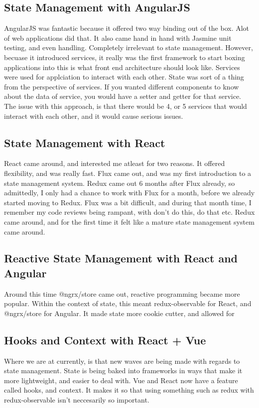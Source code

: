 \subsection{ State Management with AngularJS }
AngularJS was fantastic because it offered two way binding out of the box. Alot
of web applications did that. It also came hand in hand with Jasmine unit testing,
and even handling. Completely irrelevant to state management. However, becuase
it introduced services, it really was the first framework to start boxing
applications into this is what front end architecture should look like. Services
were used for applciation to interact with each other. State was sort of a thing
from the perspective of services. If you wanted different components to know
about the data of service, you would have a setter and getter for that service.
The issue with this approach, is that there would be 4, or 5 services that would
interact with each other, and it would cause serious issues.

\subsection{ State Management with React }
React came around, and interested me atleast for two reasons. It offered
flexibility, and was really fast. Flux came out, and was my first introduction
to a state management system. Redux came out 6 months after Flux already, so
admittedly, I only had a chance to work with Flux for a month, before we already
started moving to Redux. Flux was a bit difficult, and during that month time,
I remember my code reviews being rampant, with don't do this, do that etc. Redux
came around, and for the first time it felt like a mature state management
system came around.

\subsection{ Reactive State Management with React and Angular }
Around this time @ngrx/store came out, reactive programming became more popular.
Within the context of state, this meant redux-observable for React, and
@ngrx/store for Angular. It made state more cookie cutter, and allowed for

\subsection{ Hooks and Context with React + Vue }
Where we are at currently, is that new waves are being made with regards to
state management. State is being baked into frameworks in ways that make it
more lightweight, and easier to deal with. Vue and React now have a feature
called hooks, and context. It makes it so that using something such as redux
with redux-observable isn't neccesarily so important.
